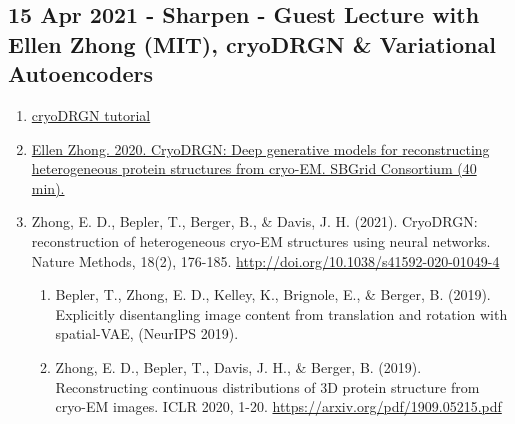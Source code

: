 \documentclass[11pt, oneside]{article}   	%
\begin{document}
\subsection{15 Apr 2021 - Sharpen - Guest Lecture with Ellen Zhong (MIT), cryoDRGN \& Variational Autoencoders}
\begin{enumerate}
	\item \href{https://www.notion.so/cryoDRGN-tutorial-b932c021cb2c415282f182048bac16ff}{cryoDRGN tutorial}
	\item \href{https://youtu.be/yft_qhErStg}{Ellen Zhong. 2020. CryoDRGN: Deep generative models for reconstructing heterogeneous protein structures from cryo-EM. SBGrid Consortium (40 min).}
	\item Zhong, E. D., Bepler, T., Berger, B., \& Davis, J. H. (2021). CryoDRGN: reconstruction of heterogeneous cryo-EM structures using neural networks. Nature Methods, 18(2), 176-185. \url{http://doi.org/10.1038/s41592-020-01049-4}
	\begin{enumerate}
		\item Bepler, T., Zhong, E. D., Kelley, K., Brignole, E., \& Berger, B. (2019). Explicitly disentangling image content from translation and rotation with spatial-VAE, (NeurIPS 2019).
		\item Zhong, E. D., Bepler, T., Davis, J. H., \& Berger, B. (2019). Reconstructing continuous distributions of 3D protein structure from cryo-EM images. ICLR 2020, 1-20. \url{https://arxiv.org/pdf/1909.05215.pdf}
	\end{enumerate}
\end{enumerate}
\end{document}
